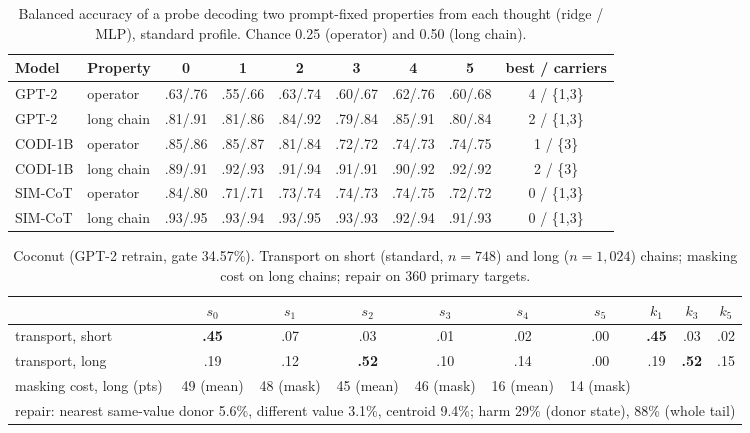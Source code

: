 \begin{table}[htbp]
\caption{Balanced accuracy of a probe decoding two prompt-fixed properties from each thought (ridge / MLP), standard profile. Chance 0.25 (operator) and 0.50 (long chain).}
\label{tab:leakage}
\centering
\scriptsize
\setlength{\tabcolsep}{3pt}
\begin{tabular}{llccccccc}
\toprule
Model & Property & 0 & 1 & 2 & 3 & 4 & 5 & best / carriers \\
\midrule
GPT-2 & operator & .63/.76 & .55/.66 & .63/.74 & .60/.67 & .62/.76 & .60/.68 & 4 / \{1,3\} \\
GPT-2 & long chain & .81/.91 & .81/.86 & .84/.92 & .79/.84 & .85/.91 & .80/.84 & 2 / \{1,3\} \\
CODI-1B & operator & .85/.86 & .85/.87 & .81/.84 & .72/.72 & .74/.73 & .74/.75 & 1 / \{3\} \\
CODI-1B & long chain & .89/.91 & .92/.93 & .91/.94 & .91/.91 & .90/.92 & .92/.92 & 2 / \{3\} \\
SIM-CoT & operator & .84/.80 & .71/.71 & .73/.74 & .74/.73 & .74/.75 & .72/.72 & 0 / \{1,3\} \\
SIM-CoT & long chain & .93/.95 & .93/.94 & .93/.95 & .93/.93 & .92/.94 & .91/.93 & 0 / \{1,3\} \\
\bottomrule
\end{tabular}
\end{table}

\begin{table}[htbp]
\caption{Coconut (GPT-2 retrain, gate 34.57\%). Transport on short (standard, $n=748$) and long ($n=1{,}024$) chains; masking cost on long chains; repair on 360 primary targets.}
\label{tab:coconut}
\centering
\scriptsize
\setlength{\tabcolsep}{3pt}
\begin{tabular}{lcccccc|ccc}
\toprule
 & $s_0$ & $s_1$ & $s_2$ & $s_3$ & $s_4$ & $s_5$ & $k_1$ & $k_3$ & $k_5$ \\
\midrule
transport, short & \textbf{.45} & .07 & .03 & .01 & .02 & .00 & \textbf{.45} & .03 & .02 \\
transport, long & .19 & .12 & \textbf{.52} & .10 & .14 & .00 & .19 & \textbf{.52} & .15 \\
masking cost, long (pts) & 49 (mean) & 48 (mask) & 45 (mean) & 46 (mask) & 16 (mean) & 14 (mask) & & & \\
\midrule
\multicolumn{10}{l}{repair: nearest same-value donor 5.6\%, different value 3.1\%, centroid 9.4\%; harm 29\% (donor state), 88\% (whole tail)} \\
\bottomrule
\end{tabular}
\end{table}


